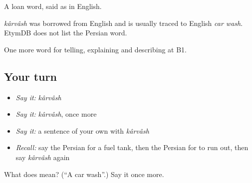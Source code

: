 A loan word, said as in English.

\begin{cousinweb}
\emph{kârvâsh} was borrowed from English and is usually traced to English \emph{car wash}. EtymDB does not list the Persian word.
\end{cousinweb}

\begin{grammarlens}[title={What you've built}]
One more word for telling, explaining and describing at B1.
\end{grammarlens}

\subsection*{Your turn}
\begin{itemize}
\raggedright
  \item \emph{Say it:} \emph{kârvâsh}
  \item \emph{Say it:} \emph{kârvâsh}, once more
  \item \emph{Say it:} a sentence of your own with \emph{kârvâsh}
  \item \emph{Recall:} say the Persian for a fuel tank, then the Persian for to run out, then say \emph{kârvâsh} again
\end{itemize}

\begin{tcolorbox}[breakable,colback=teal!4,colframe=teal!35!black,title={Before you move on}]
What does  mean? (\textquotedblleft{}A car wash\textquotedblright{}.) Say it once more.
\end{tcolorbox}

